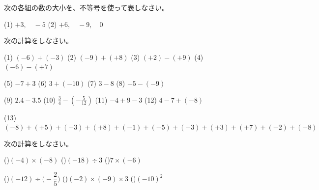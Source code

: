 \documentclass[
  12pt,a4paper,lualatex,ja=standard]{bxjsarticle}
\begin{document}
\begin{flushleft}
\vfill

\noindent{} \hspace{1pt}次の各組の数の大小を、不等号を使って表しなさい。

(1) $+3, \quad -5$ \hspace{5mm} (2) $+6,\quad -9, \quad 0$

\vfill

\noindent{} \hspace{1pt}次の計算をしなさい。

(1) $(-6) +(-3)$ \hfill (2) $(-9)+(+8)$ \hfill (3) $(+2) - (+9)$ \hfill (4) $(-6) - (+7)$ 

\vfill

(5) $-7 +3$ \hfill (6) $3 +(-10)$ \hfill (7) $3 -8$ \hfill (8) $-5 - (-9)$

\vfill

(9) $2.4 - 3.5$ \hfill (10) $\frac{3}{4} - (-\frac{5}{12})$ \hfill (11) $-4 + 9 -3$ \hfill (12) $4-7+(-8)$

\vfill

(13) $(-8) + (+5) + (-3) + (+8) + (-1) + (-5) + (+3) + (+3) + (+7) + (-2) + (-8)$

\vfill

\newpage

\noindent{} \hspace{1pt}次の計算をしなさい。

()\hspace{2.5pt}$(-4) \times (-8)$ \hspace{30mm} ()\hspace{2.5pt}$(-18) \div 3$ \hspace{30mm} ()\hspace{2.5pt}$7 \times (-6)$ 

\vfill

()\hspace{2.5pt}$(-12) \div \biggl(-\dfrac{2}{5} \biggl)$ \hspace{30mm} ()\hspace{2.5pt}$(-2) \times (-9) \times 3$ \hspace{30mm} ()\hspace{2.5pt}$(-10)^2$


\end{flushleft}
\end{document}
